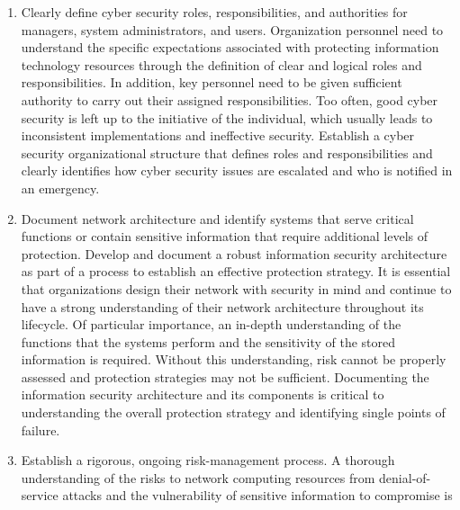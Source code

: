 \documentclass{article}
\begin{document}
\begin{enumerate}
\def\labelenumi{\arabic{enumi}.}
\setcounter{enumi}{11}
\tightlist
\item
  Clearly define cyber security roles, responsibilities, and authorities
  for managers, system administrators, and users. Organization personnel
  need to understand the specific expectations associated with
  protecting information technology resources through the definition of
  clear and logical roles and responsibilities. In addition, key
  personnel need to be given sufficient authority to carry out their
  assigned responsibilities. Too often, good cyber security is left up
  to the initiative of the individual, which usually leads to
  inconsistent implementations and ineffective security. Establish a
  cyber security organizational structure that defines roles and
  responsibilities and clearly identifies how cyber security issues are
  escalated and who is notified in an emergency.
\item
  Document network architecture and identify systems that serve critical
  functions or contain sensitive information that require additional
  levels of protection. Develop and document a robust information
  security architecture as part of a process to establish an effective
  protection strategy. It is essential that organizations design their
  network with security in mind and continue to have a strong
  understanding of their network architecture throughout its lifecycle.
  Of particular importance, an in-depth understanding of the functions
  that the systems perform and the sensitivity of the stored information
  is required. Without this understanding, risk cannot be properly
  assessed and protection strategies may not be sufficient. Documenting
  the information security architecture and its components is critical
  to understanding the overall protection strategy and identifying
  single points of failure.
\item
  Establish a rigorous, ongoing risk-management process. A thorough
  understanding of the risks to network computing resources from
  denial-of-service attacks and the vulnerability of sensitive
  information to compromise is
\end{enumerate}
\end{document}
